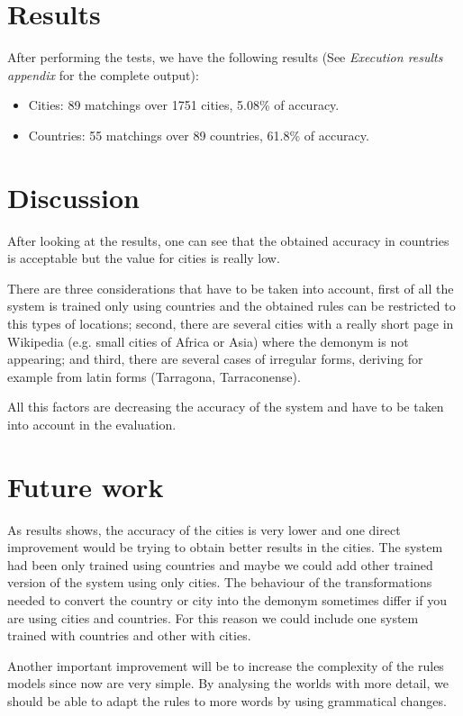 \documentclass[]{article}
\begin{document}
\section{Results}

After performing the tests, we have the following results (See \textit{Execution results appendix} for the complete output):
\begin{itemize}
\item Cities: 89 matchings over 1751 cities, 5.08\% of accuracy.
\item Countries: 55 matchings over 89 countries, 61.8\% of accuracy.
\end{itemize}



\section{Discussion}

After looking at the results, one can see that the obtained accuracy in countries is acceptable but the value for cities is really low.

There are three considerations that have to be taken into account, first of all the system is trained only using countries and the obtained rules can be restricted to this types of locations; second, there are several cities with a really short page in Wikipedia (e.g. small cities of Africa or Asia) where the demonym is not appearing; and third, there are several cases of irregular forms, deriving for example from latin forms (Tarragona, Tarraconense).

All this factors are decreasing the accuracy of the system and have to be taken into account in the evaluation.


\section{Future work}

As results shows, the accuracy of the cities is very lower and one direct improvement would be trying to obtain better results in the cities. 
The system had been only trained using countries and maybe we could add other trained version of the system using only cities. The behaviour of the transformations needed to convert the country or city into the demonym sometimes differ if you are using cities and countries. For this reason we could include one system trained with countries and other with cities. 

Another important improvement will be to increase the complexity of the rules models since now are very simple. By analysing the worlds with more detail, we should be able to adapt the rules to more words by using grammatical changes.
\end{document}
